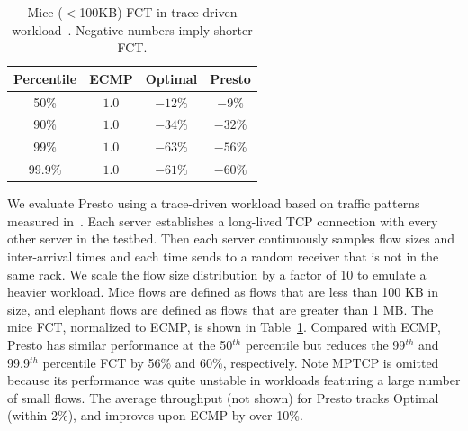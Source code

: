 \fi

\begin{table}[!tb]
\begin{center}
\begin{tabular}{ |c|c|c|c| }
 \hline
 Percentile & ECMP & Optimal &Presto \\
 \hline
 50\%   & $1.0$ & $-12\%$ & $-9\%$   \\
 90\%   & $1.0$ & $-34\%$ & $-32\%$  \\
 99\%   & $1.0$ & $-63\%$  & $-56\%$ \\
 99.9\% & $1.0$ & $-61\%$ & $-60\%$  \\
 \hline

\end{tabular}
\caption{Mice ($<$100KB) FCT in trace-driven workload~\cite{kandula2009nature}. Negative numbers imply shorter FCT.}
        \label{macro_evaluation_MSR_trace_driven}
\end{center}
\end{table}

We evaluate Presto using a trace-driven workload based on traffic patterns measured in~\cite{kandula2009nature}. 
Each server establishes a long-lived TCP connection 
with every other server in the testbed. 
Then each server continuously samples flow sizes and inter-arrival times and each time sends to a random receiver
that is not in the same rack.
We scale the flow size distribution by a factor of 10 to emulate a heavier workload. 
Mice flows are defined as flows that are less than 100 KB in size, and elephant flows are defined as flows
that are greater than 1 MB. The mice FCT, normalized to ECMP, 
is shown in Table~\ref{macro_evaluation_MSR_trace_driven}. 
Compared with ECMP, Presto has similar performance at the 50$^{th}$ percentile but reduces the 99$^{th}$ and 99.9$^{th}$ percentile FCT by 56\% and 60\%, respectively. 
Note MPTCP is omitted because its performance was quite unstable in workloads
featuring a large number of small flows.
The average throughput (not shown) for Presto tracks Optimal (within 2\%), and improves upon ECMP by over 10\%.


